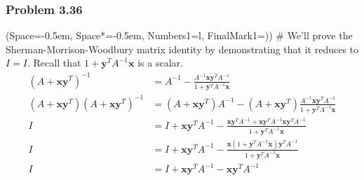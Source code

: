 \documentclass[12pt, a4paper]{article}
\newcommand{\listSpace}{-0.5em}%
\newcommand{\vect}[1]{\bm{#1}}
\begin{document}
\subsubsection*{Problem 3.36}
\begin{easylist}[enumerate]
\ListProperties(Space=\listSpace, Space*=\listSpace, Numbers1=l, FinalMark1={)})
# We'll prove the Sherman-Morrison-Woodbury matrix identity by demonstrating that it reduces to $I = I$.
Recall that $1 + \vect{y}^T A^{-1} \vect{x}$ is a scalar.
\begin{align*}
\left(A + \vect{x}\vect{y}^T\right)^{-1} &= A^{-1} - \frac{A^{-1}\vect{x}\vect{y}^TA^{-1}}{1 + \vect{y}^T A^{-1} \vect{x}} \\
\left(A + \vect{x}\vect{y}^T\right)\left(A + \vect{x}\vect{y}^T\right)^{-1} &= \left(A + \vect{x}\vect{y}^T\right)A^{-1} - \left(A + \vect{x}\vect{y}^T\right)\frac{A^{-1}\vect{x}\vect{y}^TA^{-1}}{1 + \vect{y}^T A^{-1} \vect{x}} \\
I &= I + \vect{x} \vect{y}^T A^{-1} - \frac{\vect{x}\vect{y}^T A^{-1} + \vect{x}\vect{y}^T A^{-1} \vect{x}\vect{y}^T A^{-1}}{1 + \vect{y}^T A^{-1} \vect{x}} \\
I &= I + \vect{x} \vect{y}^T A^{-1} - \frac{ \vect{x} \left( 1 + \vect{y}^T A^{-1} \vect{x} \right) \vect{y}^T A^{-1}}{1 + \vect{y}^T A^{-1} \vect{x}} \\
I &= I + \vect{x} \vect{y}^T A^{-1} - \vect{x} \vect{y}^T A^{-1} 
\end{align*}


\end{easylist}
\end{document}
